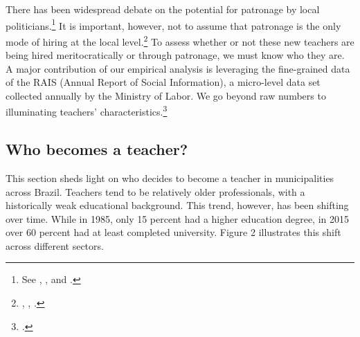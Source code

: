 \documentclass[12pt,]{book}
\newenvironment{Shaded}{\begin{snugshade}}{\end{snugshade}}
\newcommand{\DataTypeTok}[1]{\textcolor[rgb]{0.13,0.29,0.53}{#1}}
\newcommand{\DecValTok}[1]{\textcolor[rgb]{0.00,0.00,0.81}{#1}}
\newcommand{\KeywordTok}[1]{\textcolor[rgb]{0.13,0.29,0.53}{\textbf{#1}}}
\newcommand{\NormalTok}[1]{#1}
\newcommand{\OperatorTok}[1]{\textcolor[rgb]{0.81,0.36,0.00}{\textbf{#1}}}
\newcommand{\StringTok}[1]{\textcolor[rgb]{0.31,0.60,0.02}{#1}}
\let\rmarkdownfootnote\footnote%
\def\footnote{\protect\rmarkdownfootnote}
\begin{document}
There has been widespread debate on the potential for patronage by local politicians.\footnote{See \citet{akhtari_political_2015}, \citet{brollo_victor_2017}, and \citet{robinson_political_2013}.} It is important, however, not to assume that patronage is the only mode of hiring at the local level.\footnote{\citet{grindle_jobs_2012}, \citet{geddes_politicians_1994}, \citet{calvo_who_2004}.} To assess whether or not these new teachers are being hired meritocratically or through patronage, we must know who they are. A major contribution of our empirical analysis is leveraging the fine-grained data of the RAIS (Annual Report of Social Information), a micro-level data set collected annually by the Ministry of Labor. We go beyond raw numbers to illuminating teachers' characteristics.\footnote{\citet{gatti_professores_2009}.}

\subsection{Who becomes a teacher?}

This section sheds light on who decides to become a teacher in municipalities across Brazil. Teachers tend to be relatively older professionals, with a historically weak educational background. This trend, however, has been shifting over time. While in 1985, only 15 percent had a higher education degree, in 2015 over 60 percent had at least completed university. Figure 2 illustrates this shift across different sectors.

\begin{Shaded}
\end{Shaded}
\end{document}
